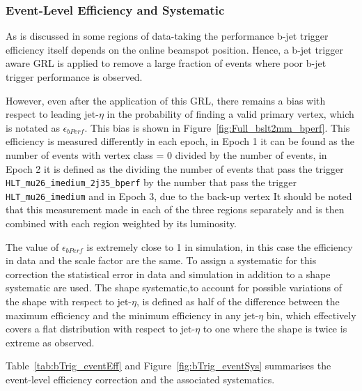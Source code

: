 \FloatBarrier
\newpage

\subsubsection{Event-Level Efficiency and Systematic}
\label{sec:trig-eventLevelEff}

As is discussed in some regions of data-taking the performance
b-jet trigger efficiency itself
depends on the online beamspot position.
Hence, a b-jet trigger aware GRL is applied to remove a large fraction of
events where poor b-jet trigger performance is observed.

However, even after the application of this GRL,
there remains a bias with respect to leading jet-$\eta$ in the
probability of finding a valid primary vertex, which is notated as $\epsilon_{bPerf}$.
This bias is shown in Figure~\ref{fig:Full_bslt2mm_bperf}.
This efficiency is measured differently in each epoch,
in Epoch 1 it can be found as the number of events with vertex class = 0 divided by the number of events,
in Epoch 2 it is defined as the dividing the number of events that pass the trigger
\verb|HLT_mu26_imedium_2j35_bperf| by the number that pass the trigger \verb|HLT_mu26_imedium|
and in Epoch 3, due to the back-up vertex 
It should be noted that this measurement made in each of the three regions separately and is then combined with each region weighted by its luminosity.

The value of $\epsilon_{bPerf}$ is extremely close to 1 in simulation, in this case the efficiency in data and the scale factor are the same.
To assign a systematic for this correction the statistical error in data and simulation in addition to a shape systematic are used.
The shape systematic,to account for possible variations of the shape with respect to jet-$\eta$,
is defined as half of the difference between the maximum efficiency and the minimum efficiency in any jet-$\eta$ bin,
which effectively covers a flat distribution with respect to jet-$\eta$ to one where the shape is twice is extreme as observed.

Table~\ref{tab:bTrig_eventEff} and Figure~\ref{fig:bTrig_eventSys}
summarises the event-level efficiency correction and the associated systematics.

